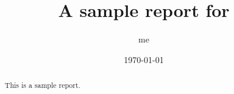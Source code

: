\documentclass[journal]{IEEEtran}
\title{A sample report for 
}
\author{ me
}
\date{\today}
\begin{document}
\maketitle

\begin{abstract}
  This is a sample report.
\end{abstract}







\end{document}
